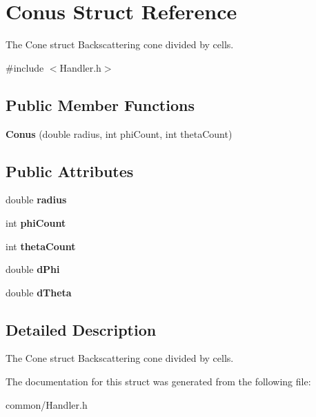 \hypertarget{struct_conus}{}\section{Conus Struct Reference}
\label{struct_conus}


The Cone struct Backscattering cone divided by cells.  




{\ttfamily \#include $<$Handler.\+h$>$}

\subsection*{Public Member Functions}
\begin{DoxyCompactItemize}
\item 
\mbox{\label{struct_conus_a1f4e7d54765ee496e5b34c0a93d9cb3f}} 
{\bfseries Conus} (double radius, int phi\+Count, int theta\+Count)
\end{DoxyCompactItemize}
\subsection*{Public Attributes}
\begin{DoxyCompactItemize}
\item 
\mbox{\label{struct_conus_a797f8b72b3df5752b5ae49842540755f}} 
double {\bfseries radius}
\item 
\mbox{\label{struct_conus_a3ec8ed2900f19341c678caffc5d59247}} 
int {\bfseries phi\+Count}
\item 
\mbox{\label{struct_conus_af928622e7097b2d9498f0b6ef2033bcd}} 
int {\bfseries theta\+Count}
\item 
\mbox{\label{struct_conus_a35305c7e8d1a073a16ff4c6ee3a6ee69}} 
double {\bfseries d\+Phi}
\item 
\mbox{\label{struct_conus_ae3294386be5abb91d9c8ebb1e2e841ae}} 
double {\bfseries d\+Theta}
\end{DoxyCompactItemize}


\subsection{Detailed Description}
The Cone struct Backscattering cone divided by cells. 

The documentation for this struct was generated from the following file\+:\begin{DoxyCompactItemize}
\item 
common/Handler.\+h\end{DoxyCompactItemize}
